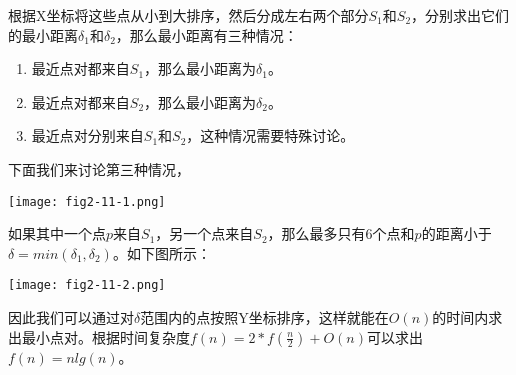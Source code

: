 根据X坐标将这些点从小到大排序，然后分成左右两个部分$S_1$和$S_2$，分别求出它们的最小距离$\delta_1$和$\delta_2$，那么最小距离有三种情况：
\begin{enumerate}
	\item 最近点对都来自$S_1$，那么最小距离为$\delta_1$。
	\item 最近点对都来自$S_2$，那么最小距离为$\delta_2$。
	\item 最近点对分别来自$S_1$和$S_2$，这种情况需要特殊讨论。
\end{enumerate}
下面我们来讨论第三种情况，
\begin{center}
	\texttt{[image: fig2-11-1.png]}\\
	\label{fig:closest-pair-of-points-1}
\end{center}
如果其中一个点$p$来自$S_1$，另一个点来自$S_2$，那么最多只有6个点和$p$的距离小于$\delta = min(\delta_1, \delta_2)$。如下图所示：
\begin{center}
	\texttt{[image: fig2-11-2.png]}\\
	\label{fig:closest-pair-of-points-2}
\end{center}
因此我们可以通过对$\delta$范围内的点按照Y坐标排序，这样就能在$O(n)$的时间内求出最小点对。根据时间复杂度$f(n)=2*f(\frac{n}{2})+O(n)$可以求出$f(n)=nlg(n)$。

